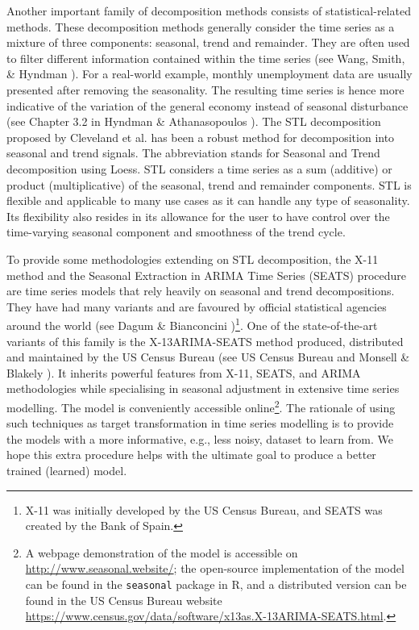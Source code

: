 Another important family of decomposition methods consists of statistical-related methods. These decomposition methods generally consider the time series as a mixture of three components: seasonal, trend and remainder. They are often used to filter different information contained within the time series (see Wang, Smith, \& Hyndman \citeyear{wang2006characteristic}). For a real-world example, monthly unemployment data are usually presented after removing the seasonality. The resulting time series is hence more indicative of the variation of the general economy instead of seasonal disturbance (see Chapter 3.2 in Hyndman \& Athanasopoulos \citeyear{forecastingprincipleandpractice}). The STL decomposition proposed by Cleveland et al. \citeyear{cleveland1990stl} has been a robust method for decomposition into seasonal and trend signals. The abbreviation stands for Seasonal and Trend decomposition using Loess. STL considers a time series as a sum (additive) or product (multiplicative) of the seasonal, trend and remainder components. STL is flexible and applicable to many use cases as it can handle any type of seasonality. Its flexibility also resides in its allowance for the user to have control over the time-varying seasonal component and smoothness of the trend cycle.

To provide some methodologies extending on STL decomposition, the X-11 method and the Seasonal Extraction in ARIMA Time Series (SEATS) procedure are time series models that rely heavily on seasonal and trend decompositions. They have had many variants and are favoured by official statistical agencies around the world (see Dagum \& Bianconcini \citeyear{dagum2016seasonal})\footnote{X-11 was initially developed by the US Census Bureau, and SEATS was created by the Bank of Spain.}. One of the state-of-the-art variants of this family is the X-13ARIMA-SEATS method produced, distributed and maintained by the US Census Bureau (see US Census Bureau \citeyear{x13arimaseatsmanual} and Monsell \& Blakely \citeyear{monsell2013x}). It inherits powerful features from X-11, SEATS, and ARIMA methodologies while specialising in seasonal adjustment in extensive time series modelling. The model is conveniently accessible online\footnote{A webpage demonstration of the model is accessible on \url{http://www.seasonal.website/}; the open-source implementation of the model can be found in the \verb+seasonal+ package in R, and a distributed version can be found in the US Census Bureau website \url{https://www.census.gov/data/software/x13as.X-13ARIMA-SEATS.html}.}.  The rationale of using such techniques as target transformation in time series modelling is to provide the models with a more informative, e.g., less noisy, dataset to learn from. We hope this extra procedure helps with the ultimate goal to produce a better trained (learned) model.

